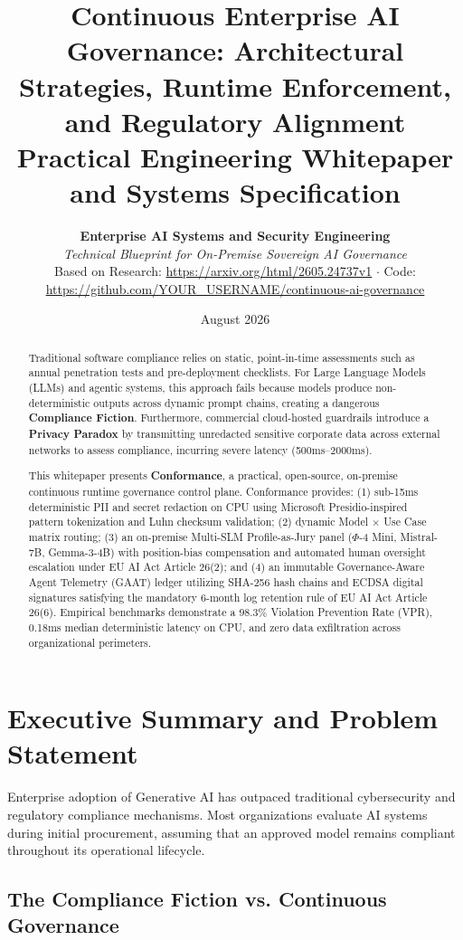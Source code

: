 \documentclass[11pt,a4paper]{article}
\title{\textbf{Continuous Enterprise AI Governance: Architectural Strategies, Runtime Enforcement, and Regulatory Alignment}\\[0.5em]
\large Practical Engineering Whitepaper and Systems Specification}
\author{
  \textbf{Enterprise AI Systems and Security Engineering}\\[0.5em]
  \textit{Technical Blueprint for On-Premise Sovereign AI Governance}\\[0.2em]
  Based on Research: \url{https://arxiv.org/html/2605.24737v1} $\cdot$ Code: \url{https://github.com/YOUR_USERNAME/continuous-ai-governance}
}
\date{August 2026}
\begin{document}
\maketitle

\begin{abstract}
Traditional software compliance relies on static, point-in-time assessments such as annual penetration tests and pre-deployment checklists. For Large Language Models (LLMs) and agentic systems, this approach fails because models produce non-deterministic outputs across dynamic prompt chains, creating a dangerous \textbf{Compliance Fiction}. Furthermore, commercial cloud-hosted guardrails introduce a \textbf{Privacy Paradox} by transmitting unredacted sensitive corporate data across external networks to assess compliance, incurring severe latency (500ms--2000ms).

This whitepaper presents \textbf{Conformance}, a practical, open-source, on-premise continuous runtime governance control plane. Conformance provides: (1) sub-15ms deterministic PII and secret redaction on CPU using Microsoft Presidio-inspired pattern tokenization and Luhn checksum validation; (2) dynamic Model $\times$ Use Case matrix routing; (3) an on-premise Multi-SLM Profile-as-Jury panel ($\Phi$-4 Mini, Mistral-7B, Gemma-3-4B) with position-bias compensation and automated human oversight escalation under EU AI Act Article 26(2); and (4) an immutable Governance-Aware Agent Telemetry (GAAT) ledger utilizing SHA-256 hash chains and ECDSA digital signatures satisfying the mandatory 6-month log retention rule of EU AI Act Article 26(6). Empirical benchmarks demonstrate a 98.3\% Violation Prevention Rate (VPR), 0.18ms median deterministic latency on CPU, and zero data exfiltration across organizational perimeters.
\end{abstract}

\tableofcontents
\newpage

\section{Executive Summary and Problem Statement}
\label{sec:exec_summary}

Enterprise adoption of Generative AI has outpaced traditional cybersecurity and regulatory compliance mechanisms. Most organizations evaluate AI systems during initial procurement, assuming that an approved model remains compliant throughout its operational lifecycle.

\subsection{The Compliance Fiction vs. Continuous Governance}
\end{document}
